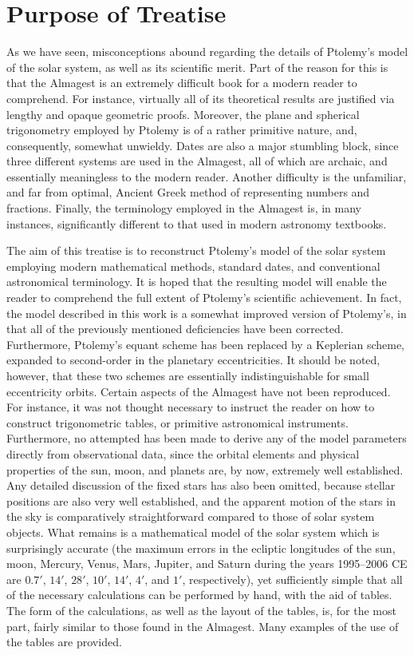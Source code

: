  \section{Purpose of Treatise}
As we have seen, misconceptions abound regarding the details of Ptolemy's model of the solar system, as well as  its scientific merit. Part of the reason for this is 
that the Almagest is an extremely difficult book for a
modern reader to comprehend.  For instance, virtually all of its theoretical results are justified via lengthy  and opaque geometric
proofs. Moreover, the  plane and
spherical trigonometry employed by Ptolemy is of a rather primitive  nature, and,
consequently, somewhat unwieldy. Dates are also a major stumbling block, since three different systems are used in the Almagest,
all of which are archaic, and essentially meaningless to the modern reader.
Another difficulty is the unfamiliar, and far from optimal, Ancient Greek method of representing numbers and fractions.
Finally, the terminology employed in the Almagest is, in many instances, significantly different to that used in modern
astronomy textbooks.

The aim of this treatise is to reconstruct Ptolemy's model of the solar system employing
modern  mathematical methods, standard dates, and conventional astronomical terminology. It
is hoped that the resulting model will enable the reader to comprehend the full extent of Ptolemy's scientific
achievement. In fact, the model described
in this work is a somewhat improved version of Ptolemy's, in that
all of the  previously mentioned deficiencies   have been corrected. Furthermore, Ptolemy's equant scheme has been replaced by a Keplerian scheme, expanded to second-order in the planetary
eccentricities.
It should be noted, however, that these two schemes are essentially indistinguishable for
small eccentricity orbits. 
Certain aspects of the Almagest have not been reproduced. For instance, it was not thought necessary to instruct the reader on how to construct
trigonometric tables, or primitive astronomical instruments. Furthermore, no attempted has been made to derive any of the model parameters directly from
 observational data, since the orbital elements and physical properties of the sun, moon, and planets are, by now, extremely well established. Any detailed discussion of the fixed stars has also been omitted, because stellar positions  are also very well established, and the apparent motion
 of the stars in the sky is comparatively straightforward compared to those of solar system objects. 
 What remains is a mathematical model of the solar
 system which is surprisingly accurate (the maximum errors in the ecliptic
 longitudes of the sun, moon, Mercury, Venus, Mars, Jupiter, and
 Saturn during the years 1995--2006 CE are $0.7'$, $14'$, $28'$, $10'$,
 $14'$, $4'$, and $1'$, respectively), yet sufficiently simple that all of the
 necessary calculations can be performed by hand, with the aid of tables. The form of the calculations, as well as the layout of the tables,
 is, for the most part, fairly similar to those found in the Almagest. Many examples
 of the use of the tables are provided. 
